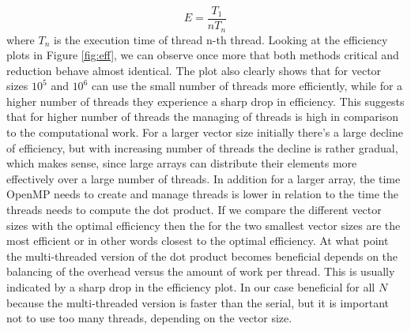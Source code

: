\begin{equation} \label{eq:eff}
E = \frac{T_1}{n T_n}
\end{equation}
where $T_n$ is the execution time of thread n-th thread.
Looking at the efficiency plots in Figure \ref{fig:eff}, we can observe once more that both methods critical and reduction behave almost identical.
The plot also clearly shows that for vector sizes $10^5$ and $10^6$ can use the small number of threads more efficiently, while for a higher number of threads they experience a sharp drop in efficiency. This suggests that for higher number of threads the managing of threads is high in comparison to the computational work. For a larger vector size initially there's a large decline of efficiency, but with increasing number of threads the decline is rather gradual, which makes sense, since large arrays can distribute their elements more effectively over a large number of threads. In addition for a larger array, the time OpenMP needs to create and manage threads is lower in relation to the time the threads needs to compute the dot product. If we compare the different vector sizes with the optimal efficiency then the for the two smallest vector sizes are the most efficient or in other words closest to the optimal efficiency.\newline
\newline
At what point the multi-threaded version of the dot product becomes beneficial depends on the balancing of the overhead versus the amount of work per thread. This is usually indicated by a sharp drop in the efficiency plot. In our case beneficial for all $N$ because the multi-threaded version is faster than the serial, but it is important not to use too many threads, depending on the vector size.    
